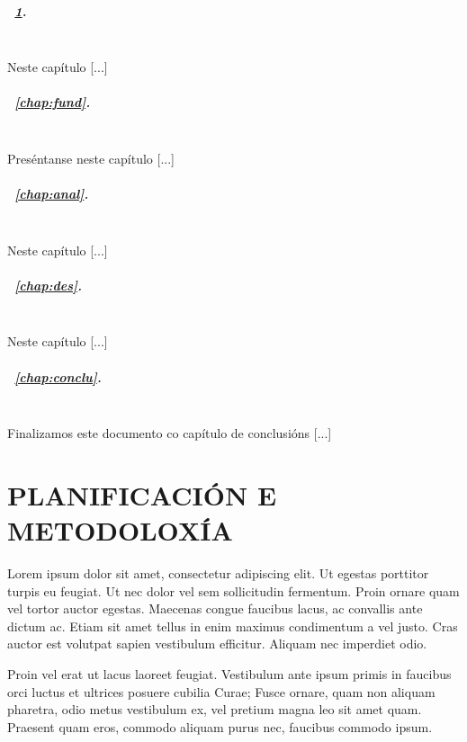 \documentclass{pfc}
\begin{document}
\paragraph{\chaptername~\ref{chap:plan}.} \textbf{}\\
Neste capítulo [...]

\paragraph{\chaptername~\ref{chap:fund}.} \textbf{}\\
Preséntanse neste capítulo [...]

\paragraph{\chaptername~\ref{chap:anal}.} \textbf{}\\
Neste capítulo [...]

\paragraph{\chaptername~\ref{chap:des}.} \textbf{}\\
Neste capítulo [...]

\paragraph{\chaptername~\ref{chap:conclu}.} \textbf{}\\
Finalizamos este documento co capítulo de conclusións [...]


\chapter{PLANIFICACIÓN E METODOLOXÍA}
\label{chap:plan}

Lorem ipsum dolor sit amet, consectetur adipiscing elit. Ut egestas
porttitor turpis eu feugiat. Ut nec dolor vel sem sollicitudin
fermentum. Proin ornare quam vel tortor auctor egestas. Maecenas
congue faucibus lacus, ac convallis ante dictum ac. Etiam sit amet
tellus in enim maximus condimentum a vel justo. Cras auctor est
volutpat sapien vestibulum efficitur. Aliquam nec imperdiet
odio.

Proin vel erat ut lacus laoreet feugiat. Vestibulum ante ipsum
primis in faucibus orci luctus et ultrices posuere cubilia Curae;
Fusce ornare, quam non aliquam pharetra, odio metus vestibulum ex, vel
pretium magna leo sit amet quam. Praesent quam eros, commodo aliquam
purus nec, faucibus commodo ipsum.
\end{document}

